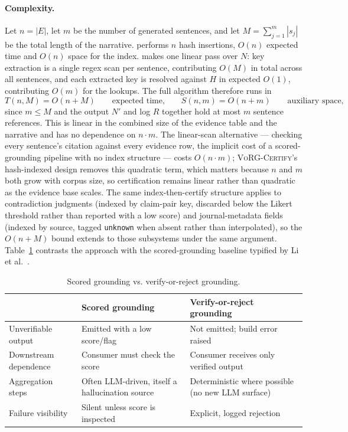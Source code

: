 \documentclass[11pt]{article}
\begin{document}
\paragraph{Complexity.} Let $n = |E|$, let $m$ be the number of generated sentences, and let $M = \sum_{j=1}^m |s_j|$ be the total length of the narrative.  performs $n$ hash insertions, $O(n)$ expected time and $O(n)$ space for the index.  makes one linear pass over $N$: key extraction is a single regex scan per sentence, contributing $O(M)$ in total across all sentences, and each extracted key is resolved against $H$ in expected $O(1)$, contributing $O(m)$ for the lookups. The full algorithm therefore runs in
\[
T(n, M) = O(n + M) \qquad \text{expected time,} \qquad S(n, m) = O(n + m) \qquad \text{auxiliary space,}
\]
since $m \le M$ and the output $N'$ and log $R$ together hold at most $m$ sentence references. This is linear in the combined size of the evidence table and the narrative and has no dependence on $n \cdot m$. The linear-scan alternative — checking every sentence's citation against every evidence row, the implicit cost of a scored-grounding pipeline with no index structure — costs $O(n \cdot m)$; \textsc{VoRG-Certify}'s hash-indexed design removes this quadratic term, which matters because $n$ and $m$ both grow with corpus size, so certification remains linear rather than quadratic as the evidence base scales. The same index-then-certify structure applies to contradiction judgments (indexed by claim-pair key, discarded below the Likert threshold rather than reported with a low score) and journal-metadata fields (indexed by source, tagged \texttt{unknown} when absent rather than interpolated), so the $O(n+M)$ bound extends to those subsystems under the same argument. Table~\ref{tab:contrast} contrasts the approach with the scored-grounding baseline typified by Li et al.~\cite{li2025enhancing}.

\begin{table}[h]
\centering
\caption{Scored grounding vs. verify-or-reject grounding.}
\label{tab:contrast}
\begin{tabular}{@{}p{3.6cm}p{5.3cm}p{5.3cm}@{}}
\toprule
& \textbf{Scored grounding} & \textbf{Verify-or-reject grounding} \\
\midrule
Unverifiable output & Emitted with a low score/flag & Not emitted; build error raised \\
Downstream dependence & Consumer must check the score & Consumer receives only verified output \\
Aggregation steps & Often LLM-driven, itself a hallucination source & Deterministic where possible (no new LLM surface) \\
Failure visibility & Silent unless score is inspected & Explicit, logged rejection \\
\bottomrule
\end{tabular}
\end{table}
\end{document}
